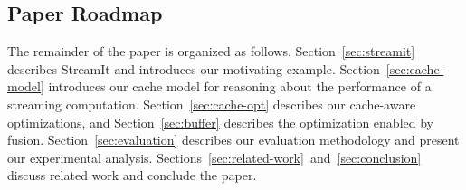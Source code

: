 \subsection{Paper Roadmap}

The remainder of the paper is organized as follows. Section~\ref{sec:streamit}
describes StreamIt and introduces our motivating example.
Section~\ref{sec:cache-model} introduces our cache model for 
reasoning about the performance of a streaming
computation. Section~\ref{sec:cache-opt} describes our cache-aware
optimizations, and Section~\ref{sec:buffer} describes the 
optimization enabled by fusion. Section~\ref{sec:evaluation} describes
our evaluation methodology and present our experimental
analysis. Sections~\ref{sec:related-work}~and~\ref{sec:conclusion}
discuss related work and conclude the paper.

